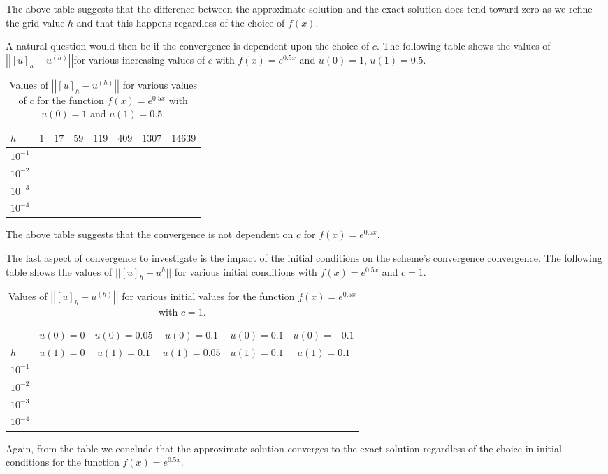 The above table suggests that the difference between the approximate solution
and the exact solution does tend toward zero as we refine the grid value $h$ and
that this happens regardless of the choice of $f(x)$.

A natural question would then be if the convergence is dependent upon the choice
of $c$. The following table shows the values of $\left|\left|[u]_h - u^{(h)}\right|\right|$for various
increasing values of $c$ with $f(x) = e^{0.5x}$ and $u(0) = 1$, $u(1) = 0.5$.

\begin{table}[h!]
  \centering
  \bgroup
  \def\arraystretch{1.5}
  \begin{tabular}{| l | c | c | c | c | c | c | c |}
    \hline
    $h$ & $1$ & $17$ & $59$ & $119$ & $409$ & $1307$ & $14639$\\
    \hline
    $10^{-1}$ & & & & & & & \\
    $10^{-2}$ & & & & & & & \\
    $10^{-3}$ & & & & & & & \\
    $10^{-4}$ & & & & & & & \\
    \hline
  \end{tabular}
  \egroup
  \caption{Values of $\left|\left|[u]_h - u^{(h)}\right|\right|$ for various values of $c$ for the function $f(x) = e^{0.5x}$ with $u(0) = 1$ and $u(1) = 0.5$.}
\end{table}

The above table suggests that the convergence is not dependent on $c$ for $f(x) = e^{0.5x}$.

The last aspect of convergence to investigate is the impact of the initial conditions
on the scheme's convergence convergence. The following table shows the values of $||[u]_h - u^{h}||$ for various
initial conditions with $f(x) = e^{0.5x}$ and $c=1$.

\begin{table}[h!]
  \centering
  \bgroup
  \def\arraystretch{1.5}
  \begin{tabular}{| l | c | c | c | c | c |}
    \hline
    & $u(0) = 0$ & $u(0) = 0.05$ & $u(0) = 0.1$ & $u(0) = 0.1$ & $u(0) = -0.1$ \\
    $h$ &  $u(1) = 0$ & $u(1) = 0.1$ & $u(1) = 0.05$ & $u(1) = 0.1$ & $u(1) = 0.1$\\
    \hline
    $10^{-1}$ & & & & & \\
    $10^{-2}$ & & & & & \\
    $10^{-3}$ & & & & & \\
    $10^{-4}$ & & & & & \\
    \hline
  \end{tabular}
  \egroup
  \caption{Values of $\left|\left|[u]_h - u^{(h)}\right|\right|$ for various initial values for the function $f(x) = e^{0.5x}$ with $c=1$.}
\end{table}

Again, from the table we conclude that the approximate solution converges to the
exact solution regardless of the choice in initial conditions for the function
$f(x) = e^{0.5x}$.